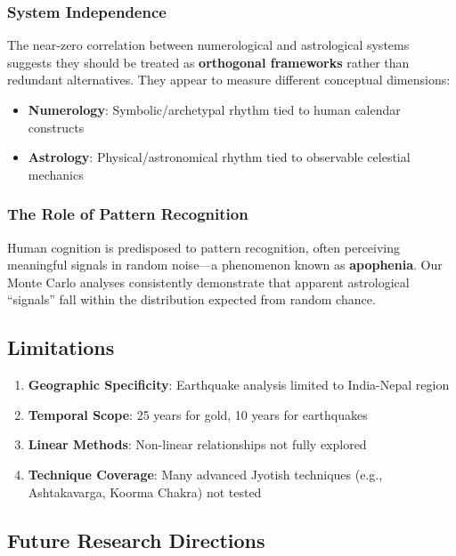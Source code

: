 \documentclass[
  11pt,
  a4paper,
  oneside,
  openany]{article}
\providecommand{\tightlist}{%
  \setlength{\itemsep}{0pt}\setlength{\parskip}{0pt}}\usepackage{longtable,booktabs,array}
\begin{document}
\subsubsection{System Independence}\label{system-independence}

The near-zero correlation between numerological and astrological systems
suggests they should be treated as \textbf{orthogonal frameworks} rather
than redundant alternatives. They appear to measure different conceptual
dimensions:

\begin{itemize}
\tightlist
\item
  \textbf{Numerology}: Symbolic/archetypal rhythm tied to human calendar
  constructs
\item
  \textbf{Astrology}: Physical/astronomical rhythm tied to observable
  celestial mechanics
\end{itemize}

\subsubsection{The Role of Pattern
Recognition}\label{the-role-of-pattern-recognition}

Human cognition is predisposed to pattern recognition, often perceiving
meaningful signals in random noise---a phenomenon known as
\textbf{apophenia}. Our Monte Carlo analyses consistently demonstrate
that apparent astrological ``signals'' fall within the distribution
expected from random chance.

\subsection{Limitations}\label{limitations}

\begin{enumerate}
\def\labelenumi{\arabic{enumi}.}
\tightlist
\item
  \textbf{Geographic Specificity}: Earthquake analysis limited to
  India-Nepal region
\item
  \textbf{Temporal Scope}: 25 years for gold, 10 years for earthquakes
\item
  \textbf{Linear Methods}: Non-linear relationships not fully explored
\item
  \textbf{Technique Coverage}: Many advanced Jyotish techniques (e.g.,
  Ashtakavarga, Koorma Chakra) not tested
\end{enumerate}

\subsection{Future Research
Directions}\label{future-research-directions}
\end{document}

